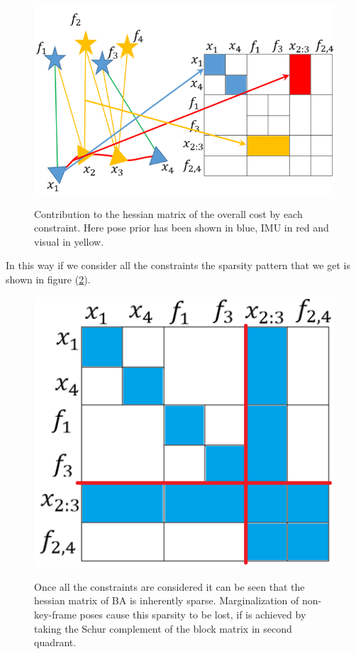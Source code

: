 \begin{figure}[ht]
	\centering
		\includegraphics[width=1.00\textwidth]{images/HessianSparsity.png}
	\label{fig:HessianSparsity}
  \caption{Contribution to the hessian matrix of the overall cost by each constraint. Here pose prior has been shown in blue, IMU in red and visual in yellow.}
\end{figure}

In this way if we consider all the constraints the sparsity pattern that we get is shown in figure (\ref{fig:HessianSparsityAllFillUp}).

\begin{figure}[ht]
	\centering
		\includegraphics[width=1.00\textwidth]{images/HessianSparsityAllFillUp.png}
	\label{fig:HessianSparsityAllFillUp}
  \caption{Once all the constraints are considered it can be seen that the hessian matrix of BA is inherently sparse. Marginalization of non-key-frame poses cause this sparsity to be lost, if is achieved by taking the Schur complement of the block matrix in second quadrant.}
\end{figure}

